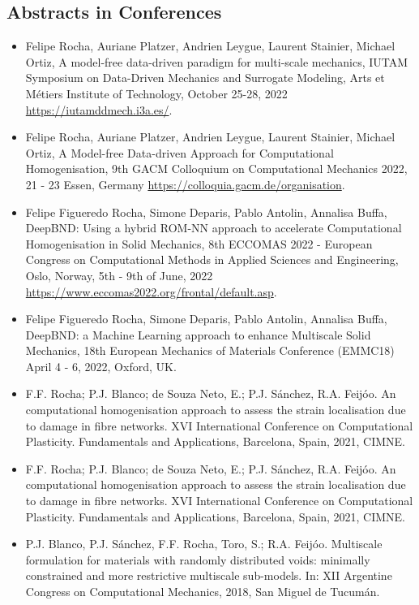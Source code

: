 \documentclass[french]{article}
\begin{document}
\subsection{Abstracts in Conferences} 
\begin{itemize}
	\item Felipe Rocha, Auriane Platzer, Andrien Leygue, Laurent Stainier, Michael Ortiz, A model-free data-driven paradigm for multi-scale mechanics, IUTAM Symposium on Data-Driven Mechanics and Surrogate Modeling, Arts et Métiers Institute of Technology, October 25-28, 2022 \url{https://iutamddmech.i3a.es/}.
	\item Felipe Rocha, Auriane Platzer, Andrien Leygue, Laurent Stainier, Michael Ortiz, A Model-free Data-driven Approach for Computational Homogenisation, 9th GACM Colloquium on Computational Mechanics 2022, 21 - 23 Essen, Germany \url{https://colloquia.gacm.de/organisation}.
	\item Felipe Figueredo Rocha, Simone Deparis, Pablo Antolin, Annalisa Buffa, 
	DeepBND: Using a hybrid ROM-NN approach to accelerate Computational Homogenisation in Solid Mechanics, 8th ECCOMAS 2022 - European Congress on Computational Methods
	in Applied Sciences and Engineering, Oslo, Norway, 5th - 9th of June, 2022 \url{https://www.eccomas2022.org/frontal/default.asp}.
	\item Felipe Figueredo Rocha, Simone Deparis, Pablo Antolin, Annalisa Buffa, 
	DeepBND: a Machine Learning approach to enhance Multiscale Solid Mechanics, 18th European Mechanics of Materials Conference (EMMC18)
	April 4 - 6, 2022, Oxford, UK.
	\item F.F. Rocha; P.J. Blanco; de Souza Neto, E.; P.J. Sánchez, R.A. Feijóo. An computational homogenisation approach to assess the strain localisation due to damage in fibre networks. XVI International Conference on Computational Plasticity. Fundamentals and Applications, Barcelona, Spain, 2021, CIMNE.
	\item F.F. Rocha; P.J. Blanco; de Souza Neto, E.; P.J. Sánchez, R.A. Feijóo. An computational homogenisation approach to assess the strain localisation due to damage in fibre networks. XVI International Conference on Computational Plasticity. Fundamentals and Applications, Barcelona, Spain, 2021, CIMNE.
	\item P.J. Blanco, P.J. Sánchez, F.F. Rocha, Toro, S.; R.A. Feijóo.
	Multiscale formulation for materials with randomly distributed voids: minimally constrained and more restrictive multiscale sub-models. In: XII Argentine Congress on
	Computational Mechanics, 2018, San Miguel de Tucumán.

\end{itemize}
\end{document}
